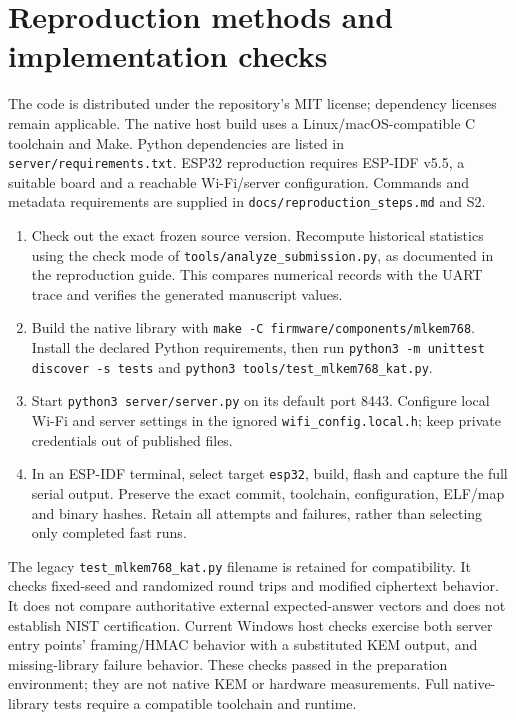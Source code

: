 \documentclass[pdflatex,sn-mathphys-num]{sn-jnl}
\begin{document}
\section{Reproduction methods and implementation checks}
The code is distributed under the repository's MIT license; dependency licenses remain applicable. The native host build uses a Linux/macOS-compatible C toolchain and Make. Python dependencies are listed in \texttt{server/requirements.txt}. ESP32 reproduction requires ESP-IDF v5.5, a suitable board and a reachable Wi-Fi/server configuration. Commands and metadata requirements are supplied in \texttt{docs/reproduction\_steps.md} and S2.

\begin{enumerate}
\item Check out the exact frozen source version. Recompute historical statistics using the check mode of \texttt{tools/analyze\_submission.py}, as documented in the reproduction guide. This compares numerical records with the UART trace and verifies the generated manuscript values.
\item Build the native library with \texttt{make -C firmware/components/mlkem768}. Install the declared Python requirements, then run \texttt{python3 -m unittest discover -s tests} and \texttt{python3 tools/test\_mlkem768\_kat.py}.
\item Start \texttt{python3 server/server.py} on its default port 8443. Configure local Wi-Fi and server settings in the ignored \texttt{wifi\_config.local.h}; keep private credentials out of published files.
\item In an ESP-IDF terminal, select target \texttt{esp32}, build, flash and capture the full serial output. Preserve the exact commit, toolchain, configuration, ELF/map and binary hashes. Retain all attempts and failures, rather than selecting only completed fast runs.
\end{enumerate}

The legacy \texttt{test\_mlkem768\_kat.py} filename is retained for compatibility. It checks fixed-seed and randomized round trips and modified ciphertext behavior. It does not compare authoritative external expected-answer vectors and does not establish NIST certification. Current Windows host checks exercise both server entry points' framing/HMAC behavior with a substituted KEM output, and missing-library failure behavior. These checks passed in the preparation environment; they are not native KEM or hardware measurements. Full native-library tests require a compatible toolchain and runtime.
\end{document}

